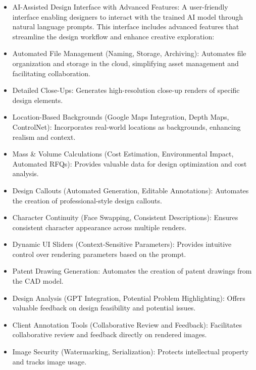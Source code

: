 \documentclass{article}
\begin{document}
\begin{itemize}
    \item AI-Assisted Design Interface with Advanced Features: A user-friendly interface enabling designers to interact with the trained AI model through natural language prompts. This interface includes advanced features that streamline the design workflow and enhance creative exploration:

    \item Automated File Management (Naming, Storage, Archiving): Automates file organization and storage in the cloud, simplifying asset management and facilitating collaboration.

    \item Detailed Close-Ups: Generates high-resolution close-up renders of specific design elements.

    \item Location-Based Backgrounds (Google Maps Integration, Depth Maps, ControlNet): Incorporates real-world locations as backgrounds, enhancing realism and context.

    \item Mass \& Volume Calculations (Cost Estimation, Environmental Impact, Automated RFQs): Provides valuable data for design optimization and cost analysis.

    \item Design Callouts (Automated Generation, Editable Annotations): Automates the creation of professional-style design callouts.

    \item Character Continuity (Face Swapping, Consistent Descriptions): Ensures consistent character appearance across multiple renders.

    \item Dynamic UI Sliders (Context-Sensitive Parameters): Provides intuitive control over rendering parameters based on the prompt.

    \item Patent Drawing Generation: Automates the creation of patent drawings from the CAD model.

    \item Design Analysis (GPT Integration, Potential Problem Highlighting): Offers valuable feedback on design feasibility and potential issues.

    \item Client Annotation Tools (Collaborative Review and Feedback): Facilitates collaborative review and feedback directly on rendered images.

    \item Image Security (Watermarking, Serialization): Protects intellectual property and tracks image usage.


\end{itemize}
\end{document}

